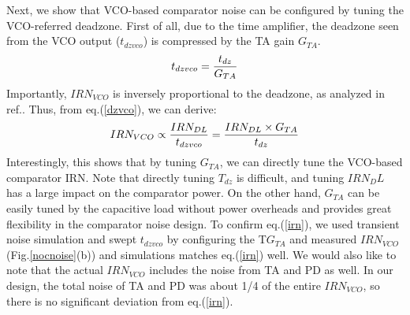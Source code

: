 \documentclass[journal]{IEEEtran}
\begin{document}

Next, we show that VCO-based comparator noise can be configured by tuning the VCO-referred deadzone.
First of all, due to the time amplifier, the deadzone seen from the VCO output ($t_{dzvco}$) is compressed by the TA gain $G_{TA}$.
\begin{eqnarray}
    \centering
    t_{dzvco} = \frac{t_{dz}}{G_{TA}}
    \label{dzvco}
\end{eqnarray}
Importantly, $IRN_{VCO}$ is inversely proportional to the deadzone, as analyzed in ref.\cite{luo2020input, ding20190}. Thus, from eq.(\ref{dzvco}), we can derive:
\begin{eqnarray}
    \centering
    IRN_{VCO} \propto \frac{IRN_{DL}}{t_{dzvco}} = \frac{IRN_{DL}\times G_{TA}}{t_{dz}}
    \label{irn}
\end{eqnarray}
Interestingly, this shows that by tuning $G_{TA}$, we can directly tune the VCO-based comparator IRN. Note that directly tuning $T_{dz}$ is difficult, and tuning $IRN_DL$ has a large impact on the comparator power. On the other hand, $G_{TA}$ can be easily tuned by the capacitive load without power overheads and provides great flexibility in the comparator noise design. To confirm eq.(\ref{irn}), we used transient noise simulation and swept $t_{dzvco}$ by configuring the T$G_{TA}$ and measured $IRN_{VCO}$ (Fig.\ref{nocnoise}(b)) and simulations  matches eq.(\ref{irn}) well. We would also like to note that the actual $IRN_{VCO}$ includes the noise from TA and PD as well. In our design, the total noise of TA and PD was about 1/4 of the entire $IRN_{VCO}$, so there is no significant deviation from eq.(\ref{irn}).
\end{document}

